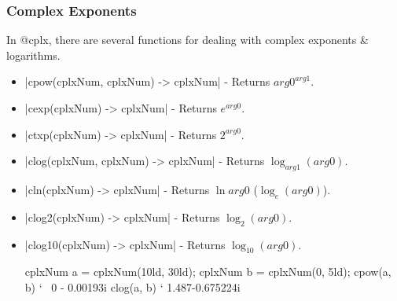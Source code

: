 \documentclass[12pt, letterpaper, oneside]{article}
\begin{document}
	\subsubsection{Complex Exponents}
	In @cplx, there are several functions for dealing with complex exponents \& logarithms.
	\begin{itemize}
		\item[--] \spverb|cpow(cplxNum, cplxNum) -> cplxNum| - Returns ${arg0}^{arg1}$.
		\item[--] \spverb|cexp(cplxNum) -> cplxNum| - Returns $e^{arg0}$.
		\item[--] \spverb|ctxp(cplxNum) -> cplxNum| - Returns $2^{arg0}$.
		\item[--] \spverb|clog(cplxNum, cplxNum) -> cplxNum| - Returns $\log_{arg1}(arg0)$.
		\item[--] \spverb|cln(cplxNum) -> cplxNum| - Returns $\ln{arg0}$ ($\log_{e}(arg0)$).
		\item[--] \spverb|clog2(cplxNum) -> cplxNum| - Returns $\log_{2}(arg0)$.
		\item[--] \spverb|clog10(cplxNum) -> cplxNum| - Returns $\log_{10}(arg0)$.
		
		\begin{spverbatim}
			cplxNum a = cplxNum(10ld, 30ld);
			cplxNum b = cplxNum(0, 5ld);
			cpow(a, b) ` ~0 - 0.00193i
			clog(a, b) ` 1.487-0.675224i
		\end{spverbatim}
	\end{itemize}
	
\end{document}
